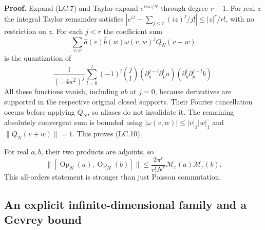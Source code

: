 \textbf{Proof.} Expand (LC.7) and Taylor-expand \(e^{i\pi\omega/N}\) through degree \(r-1\). For real \(z\) the integral Taylor remainder satisfies \(|e^{iz}-\sum_{j<r}(iz)^j/j!|\leq|z|^r/r!\), with no restriction on \(z\). For each \(j<r\) the coefficient sum \[
 \sum_{v,w}\widehat a(v)\widehat b(w)\omega(v,w)^j Q_N(v+w)
\] is the quantization of \[
 \frac{1}{(-4\pi^2)^j}\sum_{l=0}^j(-1)^l\binom jl
 (\partial_q^{j-l}\partial_p^l a)
 (\partial_q^l\partial_p^{j-l} b).                           \tag{LC.11}
\] All these functions vanish, including \(ab\) at \(j=0\), because derivatives are supported in the respective original closed supports. Their Fourier cancellation occurs before applying \(Q_N\), so aliases do not invalidate it. The remaining absolutely convergent sum is bounded using \(|\omega(v,w)|\leq|v|_1|w|_1\) and \(\|Q_N(v+w)\|=1\). This proves (LC.10).

For real \(a,b\), their two products are adjoints, so \[
 \|[\operatorname{Op}_N(a),\operatorname{Op}_N(b)]\|
 \leq\frac{2\pi^r}{r!N^r}\mathcal M_r(a)\mathcal M_r(b).      \tag{LC.12}
\] This all-orders statement is stronger than just Poisson commutation.

\subsection{An explicit infinite-dimensional family and a Gevrey bound}\label{locality:an-explicit-infinite-dimensional-family-and-a-gevrey-bound}

